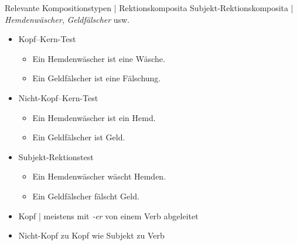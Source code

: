 \begin{frame}
  {Relevante Kompositionstypen | Rektionskomposita}
  \onslide<+->
  Subjekt-Rektionskomposita | \textit{Hemdenwäscher}, \textit{Geldfälscher} usw.
  \Halbzeile
  \begin{itemize}[<+->]
    \item Kopf--Kern-Test
      \begin{itemize}[<+->]
        \item Ein Hemdenwäscher ist eine Wäsche. \gruen{\Ck}
        \item Ein Geldfälscher ist eine Fälschung. \gruen{\Ck}
      \end{itemize}
    \item Nicht-Kopf--Kern-Test
      \begin{itemize}[<+->]
        \item Ein Hemdenwäscher ist ein Hemd. \rot{\Fl}
        \item Ein Geldfälscher ist Geld. \rot{\Fl}
      \end{itemize}
      \Halbzeile
    \item Subjekt-Rektionstest
      \begin{itemize}[<+->]
        \item Ein Hemdenwäscher wäscht Hemden. \gruen{\Ck}
        \item Ein Geldfälscher fälscht Geld. \gruen{\Ck}
      \end{itemize}
      \Halbzeile
    \item Kopf | meistens mit \alert{\textit{-er}} von einem Verb abgeleitet
    \item Nicht-Kopf zu Kopf wie \alert{Subjekt} zu Verb
  \end{itemize}
\end{frame}

